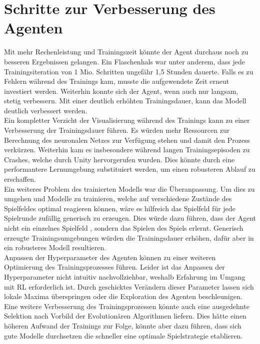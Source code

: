 \section{Schritte zur Verbesserung des Agenten}

Mit mehr Rechenleistung und Trainingszeit könnte der Agent durchaus noch zu besseren Ergebnissen gelangen. Ein Flaschenhals war unter anderem, dass jede Trainingsiteration von 1 Mio. Schritten ungefähr 1,5 Stunden dauerte. Falls es zu Fehlern während des Trainings kam, musste die aufgewendete Zeit erneut investiert werden. Weiterhin konnte sich der Agent, wenn auch nur langsam, stetig verbessern. Mit einer deutlich erhöhten Trainingsdauer, kann das Modell deutlich verbessert werden.\\
Ein kompletter Verzicht der Visualisierung während des Trainings kann zu einer Verbesserung der Trainingsdauer führen. Es würden mehr Ressourcen zur Berechnung des neuronalen Netzes  zur Verfügung stehen und damit den Prozess verkürzen. Weiterhin kam es insbesondere während langen Trainingsepisoden zu Crashes, welche durch Unity hervorgerufen wurden. Dies könnte durch eine performantere Lernumgebung substituiert werden, um einen robusteren Ablauf zu erschaffen. \\
Ein weiteres Problem des trainierten Modells war die Überanpassung. Um dies zu umgehen und Modelle zu trainieren, welche auf verschiedene Zustände des Spielfeldes optimal reagieren können, wäre es hilfreich das Spielfeld für jede Spielrunde zufällig generisch zu erzeugen. Dies würde dazu führen, dass der Agent nicht ein einzelnes Spielfeld , sondern das Spielen des Spiels erlernt. 
Generisch erzeugte Trainingsumgebungen würden die Trainingsdauer erhöhen, dafür aber in ein robusteres Modell resultieren. \\
Anpassen der Hyperparameter des Agenten können zu einer weiteren Optimierung des Trainingsprozesses führen. Leider ist das Anpassen der Hyperparameter nicht intuitiv nachvollziehbar, weshalb Erfahrung im Umgang mit RL erforderlich ist. Durch geschicktes Verändern dieser Parameter lassen sich lokale Maxima überspringen oder die Exploration des Agenten beschleunigen. \\
Eine weitere Verbesserung des Trainingsprozessen könnte auch eine ausgedehnte Selektion nach Vorbild der Evolutionären Algorithmen liefern. Dies hätte einen höheren Aufwand der Trainings zur Folge, könnte aber dazu führen, dass sich gute Modelle durchsetzen die schneller eine optimale Spielstrategie etablieren. 